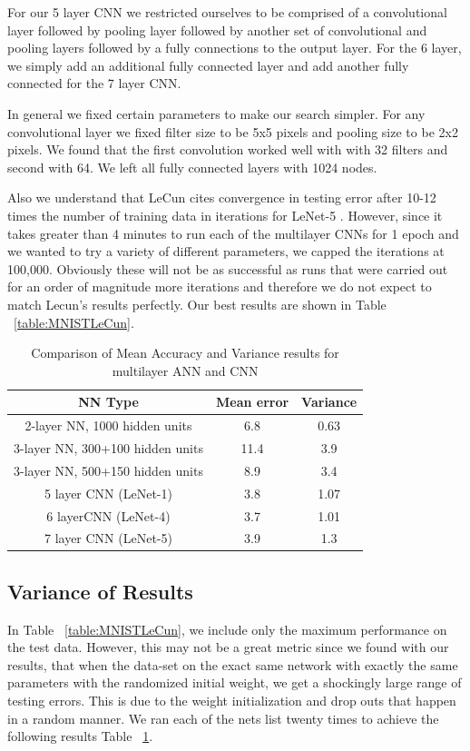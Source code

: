 \documentclass[12pt, twocolumn]{article}
\begin{document}
For our 5 layer CNN we restricted ourselves to be comprised of a convolutional layer followed by pooling layer followed by another set of convolutional and pooling layers followed by a fully connections to the output layer. For the 6 layer, we simply add an additional fully connected layer and add another fully connected for the 7 layer CNN. 


In general we fixed certain parameters to make our search simpler. For any convolutional layer we fixed filter size to be 5x5 pixels and pooling size to be 2x2 pixels. We found that the first convolution worked well with with 32 filters and second with 64.   We left all fully connected layers with 1024 nodes. 

Also we understand that LeCun cites convergence in testing error after 10-12 times the number of training data in iterations for LeNet-5 \cite{LeCun1998}. However, since it takes greater than 4 minutes to run each of the multilayer CNNs for 1 epoch and we wanted to try a variety of different parameters, we capped the iterations at 100,000. Obviously these will not be as successful as runs that were carried out for an order of magnitude more iterations and therefore we do not expect to match Lecun's results perfectly.  Our best results are shown in Table ~\ref{table:MNISTLeCun}. 

\begin{table}
	\begin{center}
		\begin{tabular} { |c | c | c | }
			\hline
			NN Type & Mean error &   Variance\\ \hline
			2-layer NN, 1000 hidden units & 6.8  & 0.63\\ \hline
			3-layer NN, 300+100 hidden units & 11.4  & 3.9 \\ \hline
			3-layer NN, 500+150 hidden units & 8.9  & 3.4\\ \hline
			5 layer CNN  (LeNet-1) & 3.8  & 1.07 \\ \hline 
			6 layerCNN (LeNet-4) & 3.7 & 1.01\\ \hline 
			7 layer CNN (LeNet-5) &  3.9  &1.3\\ \hline
		\end{tabular}		
		\caption{Comparison of Mean Accuracy and Variance results for multilayer ANN and CNN}
		\label{table:variance}
	\end{center}
\end{table}

\subsection{Variance of Results}
In Table ~\ref{table:MNISTLeCun}, we include only the maximum performance on the test data. However, this may not be a great metric since we found with our results, that when the data-set on the exact same network with exactly the same parameters with the randomized initial weight, we get a shockingly large range of testing errors. This is due to the weight initialization and drop outs that happen in a random manner. We ran each of the nets list twenty times  to achieve the following results Table ~\ref{table:variance}. 
\end{document}
